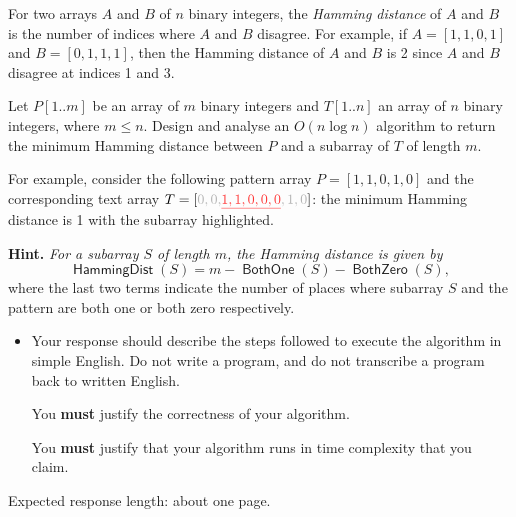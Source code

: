 \documentclass[12pt]{article}
\DeclareMathOperator{\HamDist}{\mathsf{HammingDist}}
\DeclareMathOperator{\BothZero}{\mathsf{BothZero}}
\DeclareMathOperator{\BothOne}{\mathsf{BothOne}}
\begin{document}

\begin{question}
For two arrays $A$ and $B$ of $n$ binary integers, the {\em Hamming distance} of $A$ and $B$ is the number of indices where $A$ and $B$ disagree. For example, if $A = [1, 1, 0, 1]$ and $B = [0, 1, 1, 1]$, then the Hamming distance of $A$ and $B$ is 2 since $A$ and $B$ disagree at indices 1 and 3.

Let $P[1..m]$ be an array of $m$ binary integers and $T[1..n]$ an array of $n$ binary integers, where $m \leq n$. Design and analyse an $O(n \log n)$ algorithm to return the minimum Hamming distance between $P$ and a subarray of $T$ of length $m$.

For example, consider the following pattern array $P = [1, 1, 0, 1, 0]$ and the corresponding text array $T = [\textcolor{black!30}{0, 0, } \textcolor{red!80}{\underline{1, 1, 0, 0, 0}}\textcolor{black!30}{, 1, 0}]$: the minimum Hamming distance is 1 with the subarray highlighted.

{\bfseries Hint.} {\em For a subarray $S$ of length $m$, the Hamming distance is given by} \[\HamDist(S) = m - \BothOne(S) - \BothZero(S),\] where the last two terms indicate the number of places where subarray $S$ and the pattern are both one or both zero respectively.
\end{question}

\begin{rubric}
    \begin{itemize}
    \item Your response should describe the steps followed to execute the algorithm in simple English. Do not write a program, and do not transcribe a program back to written English.
    
    You \textbf{must} justify the correctness of your algorithm.
    
    You \textbf{must} justify that your algorithm runs in time complexity that you claim.
\end{itemize}
Expected response length: about one page.
\end{rubric}

\begin{solution}
\end{solution}

\begin{attribution}
\end{attribution}
\end{document}
